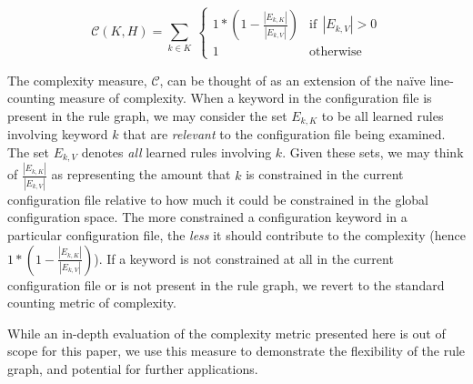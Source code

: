\begin{equation}
    \mathcal{C}(K, H) = \sum_{k \in K} \
        \begin{cases}
            1 * (1 - \frac{|E_{k, K}|}{|E_{k, V}|}) & \text{if}\ \ |E_{k, V}| > 0 \\
            1 & \text{otherwise}
        \end{cases}
\end{equation}

The complexity measure, $\mathcal{C}$, can be thought of as an
extension of the na\"ive line-counting measure of complexity.
When a keyword in the configuration file is present in the rule graph,
we may consider the set $E_{k, K}$ to be all learned rules involving
keyword $k$ that
are {\it relevant} to the configuration file being examined. 
The set $E_{k, V}$ denotes {\it all} learned rules involving $k$.
Given these sets, we may think of $\frac{|E_{k, K}|}{|E_{k, V}|}$
as representing the amount that $k$ is constrained in the current
configuration file relative to how much it could be constrained
in the global configuration space. The more constrained a configuration
keyword in a particular configuration file, the {\it less} it should
contribute to the complexity (hence $1 * (1 - \frac{|E_{k, K}|}{|E_{k, V}|})$).
If a keyword is not constrained at all in the current configuration
file or is not present in the rule graph, we revert to the standard
counting metric of complexity. 

While an in-depth evaluation of the complexity metric presented here
is out of scope for this paper, we use this measure to
demonstrate the flexibility of the rule graph, and potential
for further applications.

